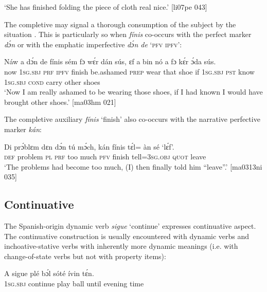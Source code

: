 \glt ‘She has finished folding the piece of cloth real nice.’ [li07pe 043]
\z

The completive may signal a thorough consumption of the subject by the situation . This is particularly so when \textit{fínis} co-occurs with the perfect marker \textit{dɔ́n} or with the emphatic imperfective \textit{dɔ́n de} ‘\textsc{pfv} \textsc{ipfv}’: 


\ea%
    \label{ex:key:364}
    \gll Náw  a    dɔ́n    de  fínis  sém      fɔ  wɛ́r    dán    sús,
ɛf  a    bin  nó    a    fɔ    kɛ́r    ɔ́da    sús.\\
now  \textsc{1sg.sbj}  \textsc{prf}    \textsc{ipfv}  finish  be.ashamed  \textsc{prep}  wear  that    shoe
if  \textsc{1sg.sbj}  \textsc{pst}  know  \textsc{1sg.sbj}  \textsc{cond}    carry  other  shoes\\

\glt ‘Now I am really ashamed to be wearing those shoes, if I had known I would have 
brought other shoes.’ [ma03hm 021]
\z

The completive auxiliary \textit{fínis} ‘finish’ also co-occurs with the narrative perfective marker \textit{kán}:


\ea%
    \label{ex:key:365}
    \gll Di  prɔ́blɛm  dɛn  dɔ́n  tú  mɔ́ch,  kán  fínis  {tɛ́l= àn}    sé    ‘lɛ́f’.\\
\textsc{def}  problem  \textsc{pl}  \textsc{prf}  too  much  \textsc{pfv}  finish  tell=3\textsc{sg.obj}  \textsc{quot}    leave\\

\glt ‘The problems had become too much, (I) then finally told him “leave”.’ [ma0313ni 035]
\z

\subsection{Continuative}\label{sec:6.4.4}

The Spanish-origin dynamic verb \textit{sigue} ‘continue’ expresses continuative aspect. The continuative construction is usually encountered with dynamic verbs and inchoative-stative verbs with inherently more dynamic meanings (i.e. with change-of-state verbs but not with property items): 


\ea%
    \label{ex:key:366}
    \gll A    sigue    plé    bɔ́l  sóté    ívin    tɛ́n.\\
\textsc{1sg.sbj}  continue    play    ball  until  evening  time\\

